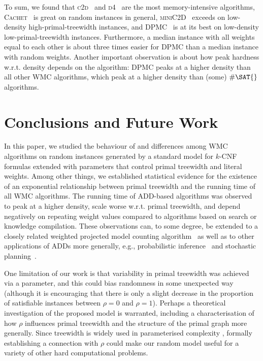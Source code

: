 \documentclass[letterpaper]{article} %
\theoremstyle{definition}
\theoremstyle{remark}
\begin{document}
To sum, we found that \textsc{c2d}~\cite{DBLP:conf/ecai/Darwiche04} and
\textsc{d4}~\cite{DBLP:conf/ijcai/LagniezM17} are the most memory-intensive
algorithms, \textsc{Cachet}~\cite{DBLP:conf/sat/SangBBKP04} is great on random
instances in general, \textsc{miniC2D}~\cite{DBLP:conf/ijcai/OztokD15} exceeds
on low-density high-primal-treewidth instances, and
\textsc{DPMC}~\cite{DBLP:conf/cp/DudekPV20} is at its best on low-density
low-primal-treewidth instances. Furthermore, a median instance with all weights
equal to each other is about three times easier for \textsc{DPMC} than a median
instance with random weights. Another important observation is about how peak
hardness w.r.t. density depends on the algorithm: \textsc{DPMC} peaks at a
higher density than all other \textsc{WMC} algorithms, which peak at a higher
density than (some) $\#\SAT{}$ algorithms.

\section{Conclusions and Future Work}

In this paper, we studied the behaviour of and differences among \textsf{WMC}
algorithms on random instances generated by a standard model for $k$-CNF
formulas extended with parameters that control primal treewidth and literal
weights. Among other things, we established statistical evidence for the
existence of an exponential relationship between primal treewidth and the
running time of all \textsf{WMC} algorithms. The running time of ADD-based
algorithms was observed to peak at a higher density, scale worse w.r.t. primal
treewidth, and depend negatively on repeating weight values compared to
algorithms based on search or knowledge compilation. These observations can, to
some degree, be extended to a closely related weighted projected model counting
algorithm~\cite{DBLP:conf/sat/DudekPV21} as well as to other applications of
ADDs more generally, e.g., probabilistic
inference~\cite{DBLP:conf/ijcai/ChaviraD07,DBLP:conf/uai/GogateD11} and
stochastic planning~\cite{DBLP:conf/uai/HoeySHB99}.

One limitation of our work is that variability in primal treewidth was achieved
via a parameter, and this could bias randomness in some unexpected way (although
it is encouraging that there is only a slight decrease in the proportion of
satisfiable instances between $\rho=0$ and $\rho = 1$). Perhaps a theoretical
investigation of the proposed model is warranted, including a characterisation
of how $\rho$ influences primal treewidth and the structure of the primal graph
more generally. Since treewidth is widely used in parameterised complexity
\cite{DBLP:series/txcs/DowneyF13}, formally establishing a connection with
$\rho$ could make our random model useful for a variety of other hard
computational problems.
\end{document}

